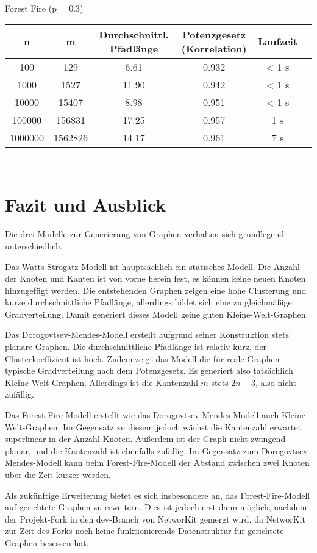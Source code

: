 \documentclass[a4paper]{scrartcl}
\begin{document}
Forest Fire (p = 0.3)\\
\begin{tabular}{|c|c|c|c|c|c|}\hline
n & m & Durchschnittl. Pfadlänge & Potenzgesetz (Korrelation) & Laufzeit \\\hline
100 & 129 & 6.61 & 0.932 & < 1 s \\\hline
1000 & 1527 & 11.90 & 0.942 & < 1 s \\\hline
10000 & 15407 & 8.98 & 0.951 & < 1 s \\\hline
100000 & 156831 & 17.25 & 0.957 & 1 s \\\hline
1000000 & 1562826 & 14.17 & 0.961 & 7 s \\\hline
\end{tabular}\\

\section{Fazit und Ausblick}
Die drei Modelle zur Generierung von Graphen verhalten sich grundlegend unterschiedlich.

Das Watts-Strogatz-Modell ist hauptsächlich ein statisches Modell. Die Anzahl der Knoten und Kanten ist von vorne herein fest, es können keine neuen Knoten hinzugefügt werden. Die entstehenden Graphen zeigen eine hohe Clusterung und kurze durchschnittliche Pfadlänge, allerdings bildet sich eine zu gleichmäßige Gradverteilung. Damit generiert dieses Modell keine guten Kleine-Welt-Graphen.

Das Dorogovtsev-Mendes-Modell erstellt aufgrund seiner Konstruktion stets planare Graphen. Die durchschnittliche Pfadlänge ist relativ kurz, der Clusterkoeffizient ist hoch. Zudem zeigt das Modell die für reale Graphen typische Gradverteilung nach dem Potenzgesetz. Es generiert also tatsächlich Kleine-Welt-Graphen. Allerdings ist die Kantenzahl $m$ stets $2n-3$, also nicht zufällig.

Das Forest-Fire-Modell erstellt wie das Dorogovtsev-Mendes-Modell auch Kleine-Welt-Graphen. Im Gegensatz zu diesem jedoch wächst die Kantenzahl erwartet superlinear in der Anzahl Knoten. Außerdem ist der Graph nicht zwingend planar, und die Kantenzahl ist ebenfalls zufällig. Im Gegensatz zum Dorogovtsev-Mendes-Modell kann beim Forest-Fire-Modell der Abstand zwischen zwei Knoten über die Zeit kürzer werden.

Als zukünftige Erweiterung bietet es sich insbesondere an, das Forest-Fire-Modell auf gerichtete Graphen zu erweitern. Dies ist jedoch erst dann möglich, nachdem der Projekt-Fork in den dev-Branch von NetworKit gemergt wird, da NetworKit zur Zeit des Forks noch keine funktionierende Datenstruktur für gerichtete Graphen besessen hat.
\end{document}
